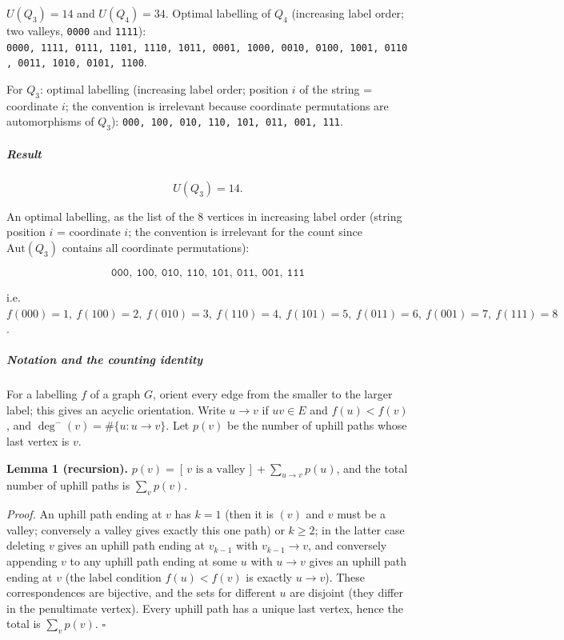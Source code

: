 
\(U(Q_3) = 14\) and \(U(Q_4) = 34\). Optimal labelling of \(Q_4\)
(increasing label order; two valleys, \texttt{0000} and \texttt{1111}):
\texttt{0000,\ 1111,\ 0111,\ 1101,\ 1110,\ 1011,\ 0001,\ 1000,\ 0010,\ 0100,\ 1001,\ 0110,\ 0011,\ 1010,\ 0101,\ 1100}.

For \(Q_3\): optimal labelling (increasing label order; position \(i\)
of the string = coordinate \(i\); the convention is irrelevant because
coordinate permutations are automorphisms of \(Q_3\)):
\texttt{000,\ 100,\ 010,\ 110,\ 101,\ 011,\ 001,\ 111}.


\subparagraph{Result}\label{result}

\[U(Q_3) = 14.\]

An optimal labelling, as the list of the 8 vertices in increasing label
order (string position \(i\) = coordinate \(i\); the convention is
irrelevant for the count since \(\mathrm{Aut}(Q_3)\) contains all
coordinate permutations):

\[\texttt{000},\ \texttt{100},\ \texttt{010},\ \texttt{110},\ \texttt{101},\ \texttt{011},\ \texttt{001},\ \texttt{111}\]

i.e.~\(f(000)=1,\ f(100)=2,\ f(010)=3,\ f(110)=4,\ f(101)=5,\ f(011)=6,\ f(001)=7,\ f(111)=8\).

\subparagraph{Notation and the counting
identity}\label{notation-and-the-counting-identity}

For a labelling \(f\) of a graph \(G\), orient every edge from the
smaller to the larger label; this gives an acyclic orientation. Write
\(u \to v\) if \(uv\in E\) and \(f(u)<f(v)\), and
\(\deg^-(v)=\#\{u: u\to v\}\). Let \(p(v)\) be the number of uphill
paths whose last vertex is \(v\).

\textbf{Lemma 1 (recursion).}
\(p(v) = [\,v \text{ is a valley}\,] + \sum_{u\to v} p(u)\), and the
total number of uphill paths is \(\sum_v p(v)\).

\emph{Proof.} An uphill path ending at \(v\) has \(k=1\) (then it is
\((v)\) and \(v\) must be a valley; conversely a valley gives exactly
this one path) or \(k\ge2\); in the latter case deleting \(v\) gives an
uphill path ending at \(v_{k-1}\) with \(v_{k-1}\to v\), and conversely
appending \(v\) to any uphill path ending at some \(u\) with \(u\to v\)
gives an uphill path ending at \(v\) (the label condition \(f(u)<f(v)\)
is exactly \(u\to v\)). These correspondences are bijective, and the
sets for different \(u\) are disjoint (they differ in the penultimate
vertex). Every uphill path has a unique last vertex, hence the total is
\(\sum_v p(v)\). \(\square\)

